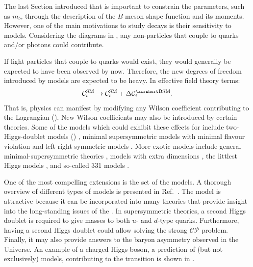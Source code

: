 The last Section introduced that \BtoXsgamma is important to constrain the \SM parameters, 
such as $m_b$, through the description of the $B$ meson shape function and its moments.
However, one of the main motivations to study \BtoXsgamma decays is their sensitivity to \BSM models.
Considering the \SM diagrams in , any non-\SM particles that couple to quarks and/or photons could contribute.

If light particles that couple to quarks would exist, they would generally be expected to have been observed by now.
Therefore, the new degrees of freedom introduced by \BSM models are expected to be heavy.
In effective field theory terms:
\begin{equation}\label{eq:corr_wilson}
    \mathcal{C}_i^{\mathrm{SM}} \ra \mathcal{C}_i^{\mathrm{SM}} + \Delta\mathcal{C}_i^{\mathrm{\BSM}}.
\end{equation}
That is, \BSM physics can manifest by modifying any Wilson coefficient contributing to the \btosgamma Lagrangian ().
New Wilson coefficients may also be introduced by certain theories.
Some of the models which could exhibit these effects for \BtoXsgamma include 
two-Higgs-doublet models (\TwoHDM) \cite{Borzumati:1998tg,Bobeth:1999ww,Hermann:2012fc}, 
minimal supersymmetric models with minimal flavour violation \cite{Bobeth:1999ww,Borzumati:2003rr,Degrassi:2006eh,Freitas:2007dp}
and left-right symmetric models \cite{Bobeth:1999ww}.
More exotic models include 
general minimal-supersymmetric theories \cite{Ciuchini:2007ha},
models with extra dimensions \cite{Buras:2003mk,Agashe:2004cp,Haisch:2007vb,Freitas:2008vh},
the littlest Higgs models \cite{Buras:2006wk,Blanke:2006sb},
and so-called 331 models \cite{Promberger:2008xg}.

One of the most compelling \SM extensions is the set of the \TwoHDM models.
A thorough overview of different types of \TwoHDM models is presented in Ref.~\cite{Branco:2011iw}.
The model is attractive because it can be incorporated into many theories that provide insight into the long-standing issues of the \SM.
In supersymmetric theories, a second Higgs doublet is required to give masses to both $u$- and $d$-type quarks.
Furthermore, having a second Higgs doublet could allow solving the strong $\mathcal{CP}$ problem.
Finally, it may also provide answers to the baryon asymmetry observed in the Universe.
An example of a charged Higgs boson, a prediction of (but not exclusively) \TwoHDM models, contributing to the \btosgamma transition is shown in .

